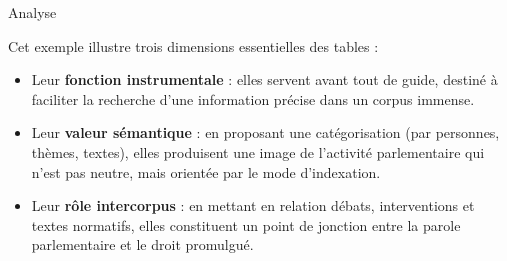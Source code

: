  Analyse

Cet exemple illustre trois dimensions essentielles des tables :

\begin{itemize}
\item Leur \textbf{fonction instrumentale} : elles servent avant tout de guide, destiné à faciliter la recherche d’une information précise dans un corpus immense.
\item Leur \textbf{valeur sémantique} : en proposant une catégorisation (par personnes, thèmes, textes), elles produisent une image de l’activité parlementaire qui n’est pas neutre, mais orientée par le mode d’indexation.
\item Leur \textbf{rôle intercorpus} : en mettant en relation débats, interventions et textes normatifs, elles constituent un point de jonction entre la parole parlementaire et le droit promulgué.
\end{itemize}

